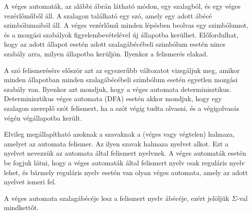 \documentclass[a4paper]{article}
\begin{document}
A véges automaták, az alábbi ábrán látható módon, egy szalagból,
és egy véges vezérlőműből áll. A szalagon található egy szó, amely egy
adott ábécé szimbólumaiból áll. A véges vezérlőmű minden lépésben
beolvas egy szimbólumot, és a mozgási szabályok figyelembevételével új
állapotba kerülhet. Előfordulhat, hogy az adott állapot esetén adott
szalagábécébeli szimbólum esetén nincs szabály arra, milyen állapotba
kerüljön. Ilyenkor a felismerés elakad.

A szó felismerésére először azt az egyszerűbb változatot vizsgáljuk meg,
amikor minden állapotban minden szalagábécébeli szimbólum esetén
egyetlen mozgási szabály van. Ilyenkor azt mondjuk, hogy a véges
automata determinisztikus. 
Determinisztikus véges automata (DFA) esetén akkor mondjuk, hogy egy
szalagon szereplő szót felismert, ha a szót végig tudta olvasni, és a
végigolvasás végén végállapotba került.

Elvileg megállapítható azoknak a szavaknak a (véges vagy végtelen)
halmaza, amelyet az automata felismer. Az ilyen szavak halmaza nyelvet
alkot. Ezt a nyelvet nevezzük az automata által felismert nyelvnek. A
véges automaták esetén be fogjuk látni, hogy a véges automaták által
felismert nyelv csak reguláris nyelv lehet, és bármely reguláris nyelv
esetén van olyan véges automata, amely az adott nyelvet ismeri fel.

A véges automata szalagábécéje lesz a felismert nyelv ábécéje, ezért
jelöljük $\Sigma$-val mindkettőt.

\end{document}
